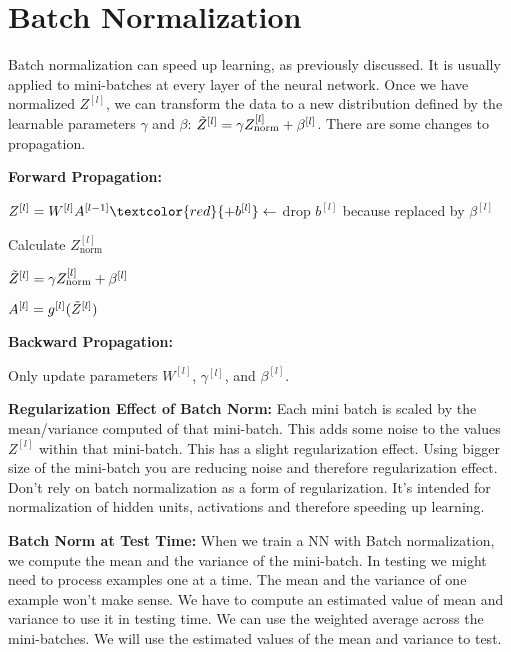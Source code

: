 \section{Batch Normalization}

Batch normalization can speed up learning, as previously discussed. It is usually applied to mini-batches at every layer of the neural network. Once we have normalized $Z^{[l]}$, we can transform the data to a new distribution defined by the learnable parameters $\gamma$ and $\beta$: $\Tilde{Z}^{[l]} = \gamma Z_\text{norm}^{[l]} + \beta^{[l]}$. There are some changes to propagation.

\textbf{Forward Propagation:}

$Z^{[l]} =  W^{[l]} A^{[l-1]} \textcolor{red}{+ b^{[l]}} \leftarrow$  drop $b^{[l]}$ because replaced by $\beta^{[l]}$

Calculate $Z_\text{norm}^{[l]}$

$\Tilde{Z}^{[l]} = \gamma Z_\text{norm}^{[l]} + \beta^{[l]}$

$A^{[l]} = g^{[l]}(\Tilde{Z}^{[l]})$

\textbf{Backward Propagation:}

Only update parameters $W^{[l]}$, $\gamma^{[l]}$, and $\beta^{[l]}$.

\textbf{Regularization Effect of Batch Norm:} Each mini batch is scaled by the mean/variance computed of that mini-batch. This adds some noise to the values $Z^{[l]}$ within that mini-batch. This has a slight regularization effect. Using bigger size of the mini-batch you are reducing noise and therefore regularization effect. Don't rely on batch normalization as a form of regularization. It's intended for normalization of hidden units, activations and therefore speeding up learning.

\textbf{Batch Norm at Test Time:} When we train a NN with Batch normalization, we compute the mean and the variance of the mini-batch. In testing we might need to process examples one at a time. The mean and the variance of one example won't make sense. We have to compute an estimated value of mean and variance to use it in testing time. We can use the weighted average across the mini-batches. We will use the estimated values of the mean and variance to test.

